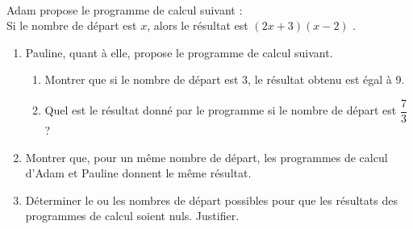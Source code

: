 \begin{activite}
   \ \\ [-16mm]
   \begin{QCM}
      Adam propose le programme de calcul suivant : \\
      \og Si le nombre de départ est $x$, alors le résultat est $(2x+3)(x-2)$ \fg.
      \begin{enumerate}
         \item Pauline, quant à elle,  propose le programme de calcul suivant. \bigskip
         \begin{center}
         \end{center}
         \begin{enumerate}
            \item Montrer que si le nombre de départ est 3, le résultat obtenu est égal à 9.
           \item Quel est le résultat donné par le programme si le nombre de départ est $\dfrac73$ ? \\ [-9mm]
         \end{enumerate}  
      \item Montrer que, pour un même nombre de départ, les programmes de calcul d’Adam et Pauline donnent le même résultat.
      \item Déterminer le ou les nombres de départ possibles pour que les résultats des programmes de calcul soient nuls. Justifier. \\
      \end{enumerate}
   \end{QCM}

   \medskip
   

\end{activite}
